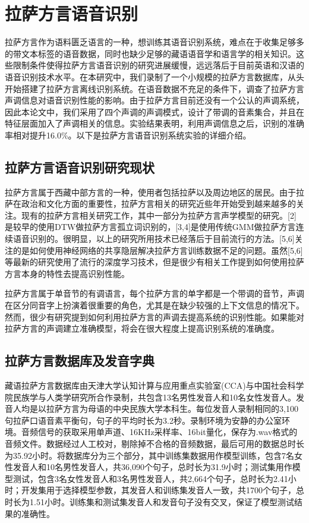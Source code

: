 ﻿%

\chapter{拉萨方言语音识别}
拉萨方言作为语料匮乏语言的一种，想训练其语音识别系统，难点在于收集足够多的带文本标签的语音数据，同时也缺少足够的藏语语音学和语言学的相关知识。这些限制条件使得拉萨方言语音识别的研究进展缓慢，远远落后于目前英语和汉语的语音识别技术水平。在本研究中，我们录制了一个小规模的拉萨方言数据库，从头开始搭建了拉萨方言离线识别系统。在语音数据不充足的条件下，调查了拉萨方言声调信息对语音识别性能的影响。由于拉萨方言目前还没有一个公认的声调系统，因此本论文中，我们采用了四个声调的声调模式，设计了带调的音素集合，并且在特征层面加入了声调相关的信息。实验结果表明，利用声调信息之后，识别的准确率相对提升16.0\%。以下是拉萨方言语音识别系统实验的详细介绍。
\section{拉萨方言语音识别研究现状}
拉萨方言属于西藏中部方言的一种，使用者包括拉萨以及周边地区的居民。由于拉萨在政治和文化方面的重要性，拉萨方言相关的研究近些年开始受到越来越多的关注。现有的拉萨方言相关研究工作，其中一部分为拉萨方言声学模型的研究。[2]是较早的使用DTW做拉萨方言孤立词识别的，[3,4]是使用传统GMM做拉萨方言连续语音识别的。很明显，以上的研究所用技术已经落后于目前流行的方法。[5,6]关注的是如何使用神经网络的共享隐层解决拉萨方言训练数据不足的问题。虽然[5,6]等最新的研究使用了流行的深度学习技术，但是很少有相关工作提到如何使用拉萨方言本身的特性去提高识别性能。

拉萨方言属于单音节的有调语言，每个拉萨方言的单字都是一个带调的音节，声调在区分同音字上扮演着很重要的角色，尤其是在缺少较强的上下文信息的情况下。然而，很少有研究提到如何利用拉萨方言的声调去提高系统的识别性能。如果能对拉萨方言的声调建立准确模型，将会在很大程度上提高识别系统的准确度。
\section{拉萨方言数据库及发音字典}
藏语拉萨方言数据库由天津大学认知计算与应用重点实验室(CCA)与中国社会科学院民族学与人类学研究所合作录制，共包含13名男性发音人和10名女性发音人。发音人均是以拉萨方言为母语的中央民族大学本科生。每位发音人录制相同的3,100句拉萨口语音素平衡句，句子的平均时长为3.2秒。录制环境为安静的办公室环境。音频信号的获取采用单声道、16KHz采样率、16bit量化，保存为.wav格式的音频文件。数据经过人工校对，剔除掉不合格的音频数据，最后可用的数据总时长为35.92小时。将数据库分为三个部分，其中训练集数据用作模型训练，包含7名女性发音人和10名男性发音人，共36,090个句子，总时长为31.9小时；测试集用作模型测试，包含3名女性发音人和3名男性发音人，共2,664个句子，总时长为2.41小时；开发集用于选择模型参数，其发音人和训练集发音人一致，共1700个句子，总时长为1.51小时。训练集和测试集发音人和发音句子没有交叉，保证了模型测试结果的准确性。

